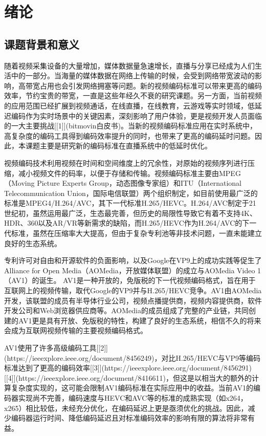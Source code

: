 
\chapter{绪论}
\section{课题背景和意义}

随着视频采集设备的大量增加，媒体数据量急速增长，直播与分享已经成为人们生活中的一部分。当海量的媒体数据在网络上传输的时候，会受到网络带宽波动的影响，高带宽占用也会引发网络拥塞等问题。新的视频编码标准可以带来更高的编码效率，节约宝贵的带宽，一直是这些年经久不衰的研究课题。另一方面，当前视频的应用范围已经扩展到视频通话，在线直播，在线教育，云游戏等实时领域，低延迟编码作为实时场景中的关键因素，深刻影响了用户体验，更是视频开发人员面临的一大主要挑战[[1]](bitmovin白皮书)。当新的视频编码标准应用在实时系统中，高复杂度的编码工具得到编码效率提升的同时，也带来了更高的编码延时问题。因此，本课题主要是研究新的编码标准在直播系统中的低延时优化。

视频编码技术利用视频在时间和空间维度上的冗余性，对原始的视频序列进行压缩，减小视频文件的码率，以便于存储和传输。视频编码标准主要由MPEG（Moving Picture Experts Group，动态图像专家组）和ITU（International Telecommunication Union，国际电信联盟）两个组织制定，如目前使用最广泛的标准是MPEG4/H.264/AVC，其下一代标准H.265/HEVC。H.264/AVC制定于21世纪初，虽然运用最广泛，生态最完善，但历史的局限性导致它有着不支持4K、HDR、360以及AR/VR等新需求的缺陷，而H.265/HEVC作为H.264/AVC的下一代标准，虽然在压缩率大大提高，但由于复杂专利池等非技术问题，一直未能建立良好的生态系统。

专利许可对自由和开源软件的负面影响，以及Google在VP9上的成功实践等促生了Alliance for Open Media（AOMedia，开放媒体联盟）的成立与AOMedia Video 1（AV1）的诞生。 AV1是一种开放的，免版税的下一代视频编码格式，旨在用于互联网上的视频传输，取代Google的VP9并与H.265/HEVC竞争。AV1由AOMedia开发，该联盟的成员有半导体行业公司，视频点播提供商，视频内容提供商，软件开发公司和Web浏览器供应商等。AOMedia的成员组成了完整的产业链，共同创建的AV1更是具有开放、免版税的特性，构建了良好的生态系统，相信不久的将来会成为互联网视频传输的主要视频编码格式。

AV1使用了许多高级编码工具[[2]](https://ieeexplore.ieee.org/document/8456249)，对比H.265/HEVC与VP9等编码标准达到了更高的编码效率[[3]](https://ieeexplore.ieee.org/document/8456291)[[4]](https://ieeexplore.ieee.org/document/8416611)，但这是以相当大的额外的计算复杂度实现的，这可能会限制AV1编码标准在实际应用中的收益。当前AV1的编码器实现尚不完善，编码速度与HEVC和AVC等的标准的成熟实现（如x264，x265）相比较低，未经充分优化，在编码延迟上更是亟须优化的挑战。因此，减少编码器运行时间、降低编码延迟且对标准编码效率的影响有限的算法将非常有益。

